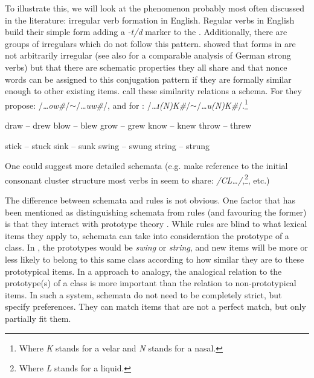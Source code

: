To illustrate this, we will look at the phenomenon probably most often discussed in the literature: irregular verb formation in English. Regular verbs in English build their simple  form adding a \textit{-t/d} marker to the . Additionally, there are groups of irregulars which do not follow this pattern. \textcite{Bybee.1982} showed that forms in  are not arbitrarily irregular (see also \textcite{Kopcke.1998a} for a comparable analysis of German strong verbs) but that there are schematic properties they all share and that nonce words can be assigned to this conjugation pattern if they are formally similar enough to other existing items. \textcite{Bybee.1982} call these similarity relations a schema. For  they propose: /\textit{\dots ow\#}/$\sim$/\textit{\dots uw\#}/, and for : /\textit{\dots ɪ(N)K\#}/$\sim$/\textit{\dots u(N)K\#}/.\footnote{Where \textit{K} stands for a velar and \textit{N} stands for a nasal.}

\begin{exe}
    \ex \label{ex-past-ew}
    \begin{xlist}
        \ex draw -- drew
        \ex blow -- blew
        \ex grow -- grew
        \ex know -- knew
        \ex throw -- threw
    \end{xlist}

    \ex \label{ex-past-nk}
    \begin{xlist}
        \ex stick -- stuck
        \ex sink -- sunk
        \ex swing -- swung
        \ex string -- strung
    \end{xlist}
\end{exe}

One could suggest more detailed schemata (e.g. make reference to the initial consonant cluster structure most verbs in  seem to share: \textit{/CL\dots/},\footnote{Where \textit{L} stands for a liquid.}, etc.)

The difference between schemata and rules is not obvious. One factor that has been mentioned as distinguishing schemata from rules (and favouring the former) is that they interact with prototype theory \autocite{Kopcke.1998a}. While rules are blind to what lexical items they apply to, schemata can take into consideration the prototype of a class. In , the prototypes would be \textit{swing} or \textit{string}, and new items will be more or less likely to belong to this same class according to how similar they are to these prototypical items. In a  approach to analogy, the analogical relation to the prototype(s) of a class is more important than the relation to non-prototypical items. In such a system, schemata do not need to be completely strict, but specify preferences. They can match items that are not a perfect match, but only partially fit them.

